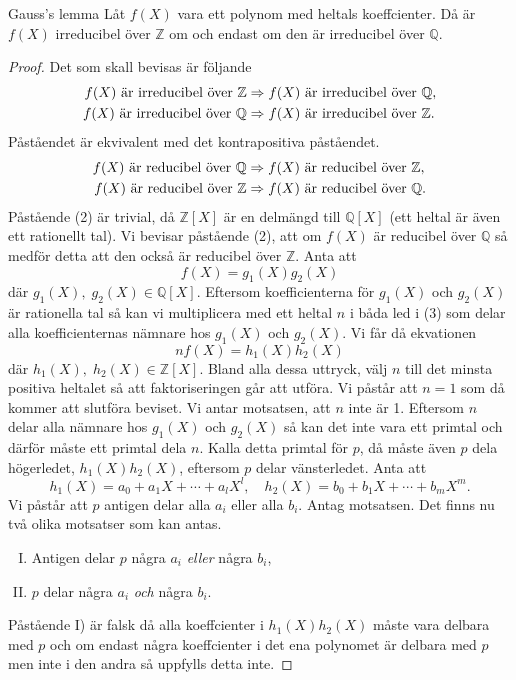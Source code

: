\documentclass{article}
\theoremstyle{definition}
\begin{document}
\begin{mylemma}{Gauss's lemma}{}
Låt $f(X)$ vara ett polynom med heltals koeffcienter. Då är $f(X)$ irreducibel över $\mathbb{Z}$ om och endast om den är irreducibel över $\mathbb{Q}$.
\end{mylemma}
\begin{proof}
  Det som skall bevisas är följande
  \begin{align*}
    f(X) \textnormal{ är irreducibel över } \mathbb{Z} &\Rightarrow f(X) \textnormal{ är irreducibel över } \mathbb{Q}, \\
    f(X) \textnormal{ är irreducibel över } \mathbb{Q} &\Rightarrow f(X) \textnormal{ är irreducibel över } \mathbb{Z}.
  \end{align*}
  Påståendet är ekvivalent med det kontrapositiva påståendet.
  \begin{align}
    f(X) \textnormal{ är reducibel över } \mathbb{Q} &\Rightarrow f(X) \textnormal{ är reducibel över } \mathbb{Z}, \\
    f(X) \textnormal{ är reducibel över } \mathbb{Z} &\Rightarrow f(X) \textnormal{ är reducibel över } \mathbb{Q}.
  \end{align}
  Påstående (2) är trivial, då $\mathbb{Z}[X]$ är en delmängd till $\mathbb{Q}[X]$ (ett heltal är även ett rationellt tal). Vi bevisar påstående (2),
  att om $f(X)$ är reducibel över $\mathbb{Q}$ så medför detta att den också är reducibel över $\mathbb{Z}$. Anta att
  \begin{equation}
    f(X) = g_1(X)g_2(X)
  \end{equation}
  där $g_1(X), \; g_2(X) \in \mathbb{Q}[X]$. Eftersom koefficienterna för $g_1(X)$ och $g_2(X)$ är rationella tal så kan vi multiplicera med ett
  heltal $n$ i båda led i (3) som delar alla koefficienternas nämnare hos $g_1(X)$ och $g_2(X)$. Vi får då ekvationen
  \begin{equation}
    nf(X) = h_1(X)h_2(X)
  \end{equation}
  där $h_1(X), \; h_2(X) \in \mathbb{Z}[X]$. Bland alla dessa uttryck, välj $n$ till det minsta positiva heltalet
  så att faktoriseringen går att utföra. Vi påstår att $n = 1$ som då kommer att slutföra beviset. Vi antar motsatsen, att $n$ inte är 1. Eftersom 
  $n$ delar alla nämnare hos $g_1(X)$ och $g_2(X)$ så kan det inte vara ett primtal och därför måste ett primtal dela $n$. Kalla detta primtal för $p$, då 
  måste även $p$ dela högerledet, $h_1(X)h_2(X)$, eftersom $p$ delar vänsterledet. Anta att 
  \[h_1(X) = a_0 + a_1X + \cdots + a_lX^l, \quad h_2(X) = b_0 + b_1X + \cdots + b_mX^m.\]
  Vi påstår att $p$ antigen delar alla $a_i$ eller alla $b_i$. Antag motsatsen. Det finns nu två olika motsatser som kan antas.
  \begin{enumerate}[I)]
    \item Antigen delar $p$ några $a_i$ \textit{eller} några $b_i$,
    \item $p$ delar några $a_i$ \textit{och} några $b_i$.
  \end{enumerate}
  Påstående I) är falsk då alla koeffcienter i $h_1(X)h_2(X)$ måste vara delbara med $p$ och om endast några koeffcienter i det ena polynomet 
  är delbara med $p$ men inte i den andra så uppfylls detta inte. 


\end{proof}
\end{document}
